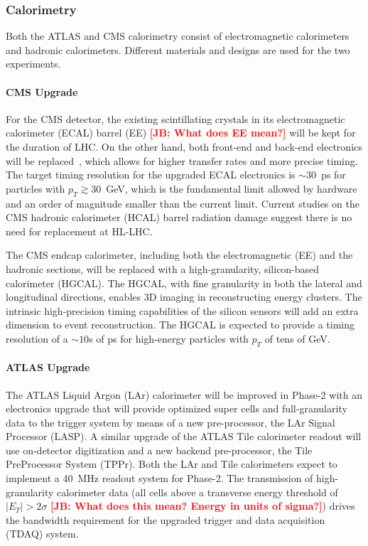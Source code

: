 \subsubsection{Calorimetry} \label{sec:upgradecalo}

Both the ATLAS and CMS calorimetry consist of electromagnetic calorimeters and hadronic calorimeters. Different materials and designs are used for the two experiments. 

\paragraph{CMS Upgrade} 
For the CMS detector, the existing scintillating crystals in its electromagnetic calorimeter (ECAL) barrel (EE) {\bf \textcolor{red}{[JB: What does EE mean?]}} will be kept for the duration of LHC. On the other hand, both front-end and back-end electronics will be replaced~\cite{Lourenco:2283187}, which allows for higher transfer rates and more precise timing. The target timing resolution for the upgraded ECAL electronics is $\sim30$~ps for particles with $p_T \gtrsim30$~GeV, which is the fundamental limit allowed by hardware and an order of magnitude smaller than the current limit. Current studies on the CMS hadronic calorimeter (HCAL) barrel radiation damage suggest there is no need for replacement at HL-LHC. 

The CMS endcap calorimeter, including both the electromagnetic (EE) and the hadronic sections, will be replaced with a high-granularity, silicon-based calorimeter (HGCAL). The HGCAL, with fine granularity in both the lateral and longitudinal directions, enables 3D imaging in reconstructing energy clusters. The intrinsic high-precision timing capabilities of the silicon sensors will add an extra dimension to event reconstruction. The HGCAL is expected to provide a timing resolution of a $\sim10$s of ps for high-energy particles with $p_T$ of tens of GeV.

\paragraph{ATLAS Upgrade}

The ATLAS Liquid Argon (LAr) calorimeter will be improved in Phase-2 with an electronics upgrade that will provide optimized super cells and full-granularity data to the trigger system by means of a new pre-processor, the LAr Signal Processor (LASP). A similar upgrade of the ATLAS Tile calorimeter readout will use on-detector digitization and a new backend pre-processor, the Tile PreProcessor System (TPPr). Both the LAr and Tile calorimeters expect to implement a 40~MHz readout system for Phase-2. The transmission of high-granularity calorimeter data (all cells above a transverse energy threshold of $|E_T| > 2\sigma$ {\bf \textcolor{red}{[JB: What does this mean? Energy in units of sigma?]}}) drives the bandwidth requirement for the upgraded trigger and data acquisition (TDAQ) system.

